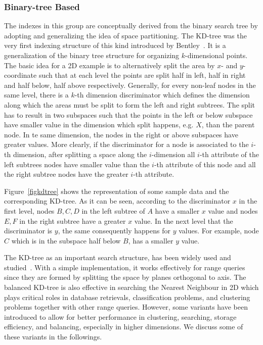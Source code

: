 \documentclass[a4paper,12pt]{article}
\begin{document}
\subsubsection{Binary-tree Based}
\label{binary-tree-based}
The indexes in this group are conceptually derived from the binary search tree by adopting and generalizing the idea of space partitioning. 
The KD-tree was the very first indexing structure of this kind introduced by Bentley~\cite{bently1975}. 
It is a generalization of the binary tree structure for organizing $k$-dimensional points. The basic idea for a 2D example is to alternatively split the area by $x$- and $y$-coordinate such that at each level the points are split half in left, half in right and half below, half above respectively. Generally, for every non-leaf nodes in the same level, there is a $k$-th dimension discriminator which defines the dimension along which the areas must be split to form the left and right subtrees. The split has to result in two subspaces such that the points in the left or below subspace have smaller value in the dimension which split happens, e.g. $X$, than the parent node. In te same dimension, the nodes in the right or above subspaces have greater values. More clearly, if the discriminator for a node is associated to the $i$-th dimension, after splitting a space along the $i$-dimension all $i$-th attribute of the left subtrees nodes have smaller value than the $i$-th attribute of this node and all the right subtree nodes have the greater $i$-th attribute. 

Figure~\ref{figkdtree} shows the representation of some sample data and the corresponding KD-tree. As it can be seen, according to the discriminator $x$ in the first level, nodes $B, C, D$ in the left subtree of $A$ have a smaller $x$ value and nodes $E, F$ in the right subtree have a greater $x$ value. In the next level that the discriminator is $y$, the same consequently happens for $y$ values. For example, node $C$ which is in the subspace half below $B$, has a smaller $y$ value.

The KD-tree as an important search structure, has been widely used and studied~\cite{ilprints723}. With a simple implementation, it works effectively for range queries since they are formed by splitting the space by planes orthogonal to axis. The balanced KD-tree is also effective in searching the Nearest Neighbour in 2D which plays critical roles in database retrievals, classification problems, and clustering problems together with other range queries. However, some variants have been introduced to allow for better performance in clustering, searching, storage efficiency,  
and balancing, especially in higher dimensions. We discuss some of these variants in the followings.
\end{document}
